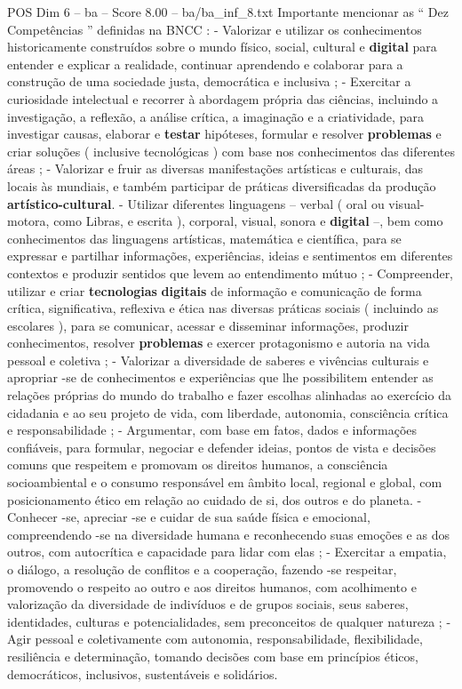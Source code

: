 \begin{textsample}{POS Dim 6 – ba – Score 8.00 – ba/ba\_inf\_8.txt}
Importante mencionar as “ Dez Competências ” definidas na BNCC : - Valorizar e utilizar os conhecimentos historicamente construídos sobre o mundo físico, social, cultural e \textbf{digital} para entender e explicar a realidade, continuar aprendendo e colaborar para a construção de uma sociedade justa, democrática e inclusiva ; - Exercitar a curiosidade intelectual e recorrer à abordagem própria das ciências, incluindo a investigação, a reflexão, a análise crítica, a imaginação e a criatividade, para investigar causas, elaborar e \textbf{testar} hipóteses, formular e resolver \textbf{problemas} e criar soluções ( inclusive tecnológicas ) com base nos conhecimentos das diferentes áreas ; - Valorizar e fruir as diversas manifestações artísticas e culturais, das locais às mundiais, e também participar de práticas diversificadas da produção \textbf{artístico-cultural}. - Utilizar diferentes linguagens – verbal ( oral ou visual-motora, como Libras, e escrita ), corporal, visual, sonora e \textbf{digital} –, bem como conhecimentos das linguagens artísticas, matemática e científica, para se expressar e partilhar informações, experiências, ideias e sentimentos em diferentes contextos e produzir sentidos que levem ao entendimento mútuo ; - Compreender, utilizar e criar \textbf{tecnologias} \textbf{digitais} de informação e comunicação de forma crítica, significativa, reflexiva e ética nas diversas práticas sociais ( incluindo as escolares ), para se comunicar, acessar e disseminar informações, produzir conhecimentos, resolver \textbf{problemas} e exercer protagonismo e autoria na vida pessoal e coletiva ; - Valorizar a diversidade de saberes e vivências culturais e apropriar -se de conhecimentos e experiências que lhe possibilitem entender as relações próprias do mundo do trabalho e fazer escolhas alinhadas ao exercício da cidadania e ao seu projeto de vida, com liberdade, autonomia, consciência crítica e responsabilidade ; - Argumentar, com base em fatos, dados e informações confiáveis, para formular, negociar e defender ideias, pontos de vista e decisões comuns que respeitem e promovam os direitos humanos, a consciência socioambiental e o consumo responsável em âmbito local, regional e global, com posicionamento ético em relação ao cuidado de si, dos outros e do planeta. - Conhecer -se, apreciar -se e cuidar de sua saúde física e emocional, compreendendo -se na diversidade humana e reconhecendo suas emoções e as dos outros, com autocrítica e capacidade para lidar com elas ; - Exercitar a empatia, o diálogo, a resolução de conflitos e a cooperação, fazendo -se respeitar, promovendo o respeito ao outro e aos direitos humanos, com acolhimento e valorização da diversidade de indivíduos e de grupos sociais, seus saberes, identidades, culturas e potencialidades, sem preconceitos de qualquer natureza ; - Agir pessoal e coletivamente com autonomia, responsabilidade, flexibilidade, resiliência e determinação, tomando decisões com base em princípios éticos, democráticos, inclusivos, sustentáveis e solidários.

\end{textsample}
